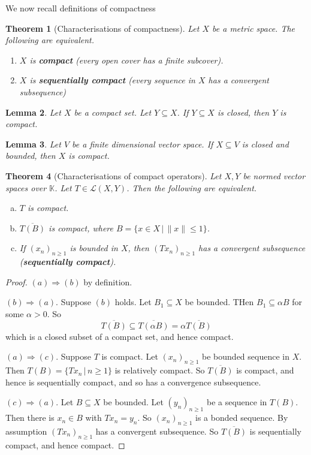 \documentclass[10pt, oneside, reqno]{amsart}
\theoremstyle{plain}%
\newtheorem{thm}{Theorem}[section]
\newtheorem{lem}[thm]{Lemma}
\theoremstyle{definition}
\theoremstyle{remark}
\newcommand{\given}{ \, | \,}
\newcommand{\K}{\mathbb{K}}
\begin{document}
We now recall definitions of compactness
\begin{thm}[Characterisations of compactness]
	Let $X$ be a metric space. The following are equivalent.  
	\begin{enumerate}[(1)]
		\item $X$ is \textbf{compact} (every open cover has a finite subcover).
		\item $X$ is \textbf{sequentially compact} (every sequence in $X$ has a convergent subsequence)
	\end{enumerate}
\end{thm}

\begin{lem}
	Let $X$ be a compact set.  Let $Y \subseteq X$. If $Y \subseteq X$ is closed, then $Y$ is compact.
\end{lem}

\begin{lem}
	Let $V$ be a finite dimensional vector space.  If $X \subseteq V$ is closed and bounded, then $X$ is compact.
\end{lem}

\begin{thm}[Characterisations of compact operators]
	\label{thm:charcompact}
	Let $X, Y$ be normed vector spaces over $\K$.  Let $T \in \mathcal L(X,Y)$.  Then the following are equivalent.
	\begin{enumerate}[(a)]
		\item $T$ is compact.
		\item $\overline{T(B)}$ is compact, where $B = \{ x \in X \given \| x \| \leq 1 \}$.  
		\item If $(x_n)_{n \geq 1}$ is bounded in $X$, then $(Tx_n)_{n \geq 1}$ has a convergent subsequence (\textbf{sequentially compact}).
	\end{enumerate}
\end{thm}

\begin{proof}
	$(a) \Rightarrow (b)$ by definition.
	
	$(b) \Rightarrow (a)$.  Suppose $(b)$ holds.  Let $B_1 \subseteq X$ be bounded.  THen $B_1 \subseteq \alpha B$ for some $\alpha > 0$.  So \[
		\overline{T(B)} \subseteq \overline{T(\alpha B)} = \alpha \overline{T(B)}
	\] which is a closed subset of a compact set, and hence compact.  
	
	$(a) \Rightarrow (c)$.  Suppose $T$ is compact.  Let $(x_n)_{n \geq 1}$ be bounded sequence in $X$.  Then $T(B) = \{ Tx_n \given n \geq 1 \}$ is relatively compact.  So $\overline{T(B)}$ is compact, and hence is sequentially compact, and so has a convergence subsequence.
	
	$(c) \Rightarrow (a)$.  Let $B \subseteq X$ be bounded.  Let $(y_n)_{n \geq 1}$ be a sequence in $T(B)$.  Then there is $x_n \in B$ with $Tx_n = y_n$.  So $(x_n)_{n \geq 1}$ is a bonded sequence.  By assumption $(Tx_n)_{n \geq 1}$ has a convergent subsequence.  So $\overline{T(B)}$ is sequentially compact, and hence compact.
\end{proof}
\end{document}
